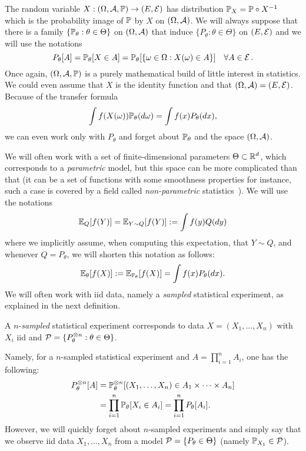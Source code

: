 The random variable $X : (\Omega, \cA, \P) \rightarrow (E, \cE)$ has distribution $\P_X = \P \circ X^{-1}$ which is the probability image of $\P$ by $X$ on $(\Omega, \cA)$.
We will always suppose that there is a family $\{ \P_\theta : \theta \in \Theta\}$ on $(\Omega, \cA)$ that induce $\{ P_\theta : \theta \in \Theta\}$ on $(E, \cE)$ and we will use the notations
\begin{equation*}
	P_\theta[A] = \P_\theta[X \in A] = \P_\theta[ \{ \omega \in \Omega : X(\omega) \in A \}] \quad \forall A \in \cE.
\end{equation*}%
Once again, $(\Omega, \cA, \P)$ is a purely mathematical build of little interest in statistics.
We could even assume that $X$ is the identity function and that $(\Omega, \cA) = (E, \cE)$.
Because of the transfer formula
\begin{equation*}
	\int f(X(\omega)) \P_\theta(d \omega) = \int f(x) P_\theta(dx),
\end{equation*}
we can even work only with $P_\theta$ and forget about $\P_\theta$ and the space $(\Omega, \cA)$.	

We will often work with a set of finite-dimensional parameters $\Theta \subset \R^d$, which corresponds to a \emph{parametric} model, but this space can be more complicated than that (it can be a set of functions with some smoothness properties for instance, such a case is covered by a field called \emph{non-parametric} statistics~).
We will use the notations
\begin{equation*}
	\E_Q [f(Y)] = \E_{Y \sim Q} [f(Y)] := \int f(y) Q(dy)
\end{equation*}
where we implicitly assume, when computing this expectation, that $Y \sim Q$, and whenever $Q = P_\theta$, we will shorten this notation as follows:
\begin{equation*}
	\E_\theta [f(X)] := \E_{\P_\theta} [f(X)] = \int f(x) P_\theta(dx).
\end{equation*}
We will often work with iid data, namely a \emph{sampled} statistical experiment, as explained in the next definition.
\begin{definition}
A $n$-\emph{sampled} statistical experiment corresponds to data $X = (X_1, \ldots, X_n)$ with $X_i$ iid and $\cP = \{ P_\theta^{\otimes n} : \theta \in \Theta\}$.
\end{definition}
Namely, for a $n$-sampled statistical experiment and $A = \prod_{i=1}^n A_i$, one has the following:
\begin{align*}
	P_\theta^{\otimes n}[A] &= \P_\theta^{\otimes n}[ (X_1, \ldots, X_n) \in A_1 \times \cdots \times A_n] \\
	&= \prod_{i=1}^n \P_\theta[X_i \in A_i] = \prod_{i=1}^n P_\theta[A_i].
\end{align*}
However, we will quickly forget about $n$-sampled experiments and simply say that we observe iid data $X_1, \ldots, X_n$ from a model $\cP = \{ P_\theta \in \Theta \}$ (namely $\P_{X_1} \in \cP$).

